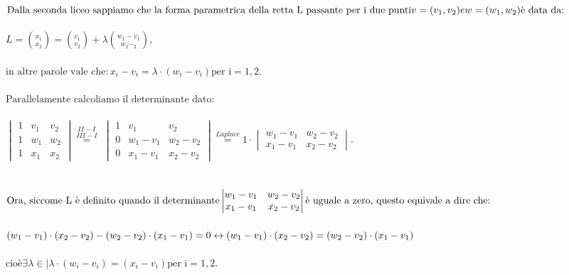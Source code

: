 \documentclass[a4paper,10pt]{article}
\begin{document}
 \\\\
    $\text{Dalla seconda liceo sappiamo che la forma parametrica della retta L passante per i due punti} \\
v=(v_1,v_2) e w=(w_1,w_2) \text{è data da:}$
\\
\\
$L= \binom{x_1}{x_2}= \binom{v_1}{v_2} + \lambda \binom{w_1 - v_1}{w_2 -_2},$
\\
\\
$\text{in altre parole vale che}: x_i - v_i = \lambda \cdot (w_i - v_i) \text{per i}=1,2.$
\\
\\
$\text{Parallelamente calcoliamo il determinante dato:}$
\\
\\
$\begin{vmatrix}
1 & v_1 & v_2 \\
1 & w_1 & w_2 \\
1 & x_1 & x_2 
\end{vmatrix}
\stackrel{II-I}{\stackrel{III-I}{=}} $
$\begin{vmatrix}
1 & v_1 & v_2 \\
0 & w_1-v_1 & w_2 -v_2 \\
0 & x_1 - v_1 & x_2 - v_2
\end{vmatrix}
\stackrel{Laplace}{=} 1\cdot 
\begin{vmatrix} 
w_1 - v_1 & w_2 -v_2 \\
x_1 -v_1 & x_2 -v_2 
\end{vmatrix}.$
\\
\\
\\
$\text{Ora, siccome L è definito quando il determinante}
\begin{vmatrix}
w_1-v_1 & w_2-v_2 \\
x_1-v_1 & x_2-v_2
\end{vmatrix}
\\
\text{è uguale a zero, 
 questo equivale a dire che:}$
 \\
 \\
$(w_1-v_1) \cdot (x_2 -v_2) - (w_2 -v_2) \cdot (x_1 -v_1) = 0 
\\
\\
\leftrightarrow(w_1 -v_1) \cdot (x_2-v_2) = (w_2 -v_2) \cdot (x_1 -v_1)$
\\
\\
$ \text{cioè} \exists \lambda \in \mid \lambda \cdot (w_i -v_i) = (x_i - v_i) \text{per i}=1,2.$

\end{document}
